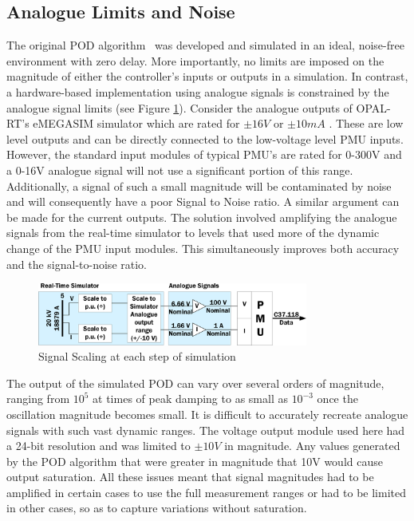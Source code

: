 \documentclass[journal]{IEEEtran}
\begin{document}
\subsection{Analogue Limits and Noise}
The original POD algorithm~\cite{PhasorPOD} was developed and simulated in an ideal, noise-free environment with zero delay. More importantly, no limits are imposed on the magnitude of either the controller's inputs or outputs in a simulation. In contrast, a hardware-based implementation using analogue signals is constrained by the analogue signal limits (see Figure \ref{ScalingProblem}). Consider the analogue outputs of OPAL-RT's eMEGASIM simulator which are rated for $\pm16V$ or $\pm10mA$  \cite{eMEGASIM}.
These are low level outputs and can be directly connected to the low-voltage level PMU inputs. However, the standard input modules of typical PMU's are rated for 0-300V and a 0-16V analogue signal will not use a significant portion of this range. Additionally, a signal of such a small magnitude will be contaminated by noise and will consequently have a poor Signal to Noise ratio. A similar argument can be made for the current outputs. The solution involved amplifying the analogue signals from the real-time simulator to levels that used more of the dynamic change of the PMU input modules. This simultaneously improves both accuracy and the signal-to-noise ratio.

\begin{figure}[!th]
\centering
\includegraphics[width=3.5in]{Scaling.png}
\vspace{-1.3em}
\caption{Signal Scaling at each step of simulation}
\label{ScalingProblem}
\end{figure}
\vspace{-0.4em}
The output of the simulated POD can vary over several orders of magnitude, ranging from $10^{5}$ at times of peak damping to as small as $10^{-3}$ once the oscillation magnitude  becomes small. It is difficult to accurately recreate analogue signals with such vast dynamic ranges. The voltage output module used here had a 24-bit resolution and was limited to $\pm 10V$ in magnitude. Any values generated by the POD algorithm that were greater in magnitude that 10V would cause output saturation. All these issues meant that signal magnitudes had to be amplified in certain cases to use the full measurement ranges or had to be limited in other cases, so as to capture variations without saturation.
\end{document}
